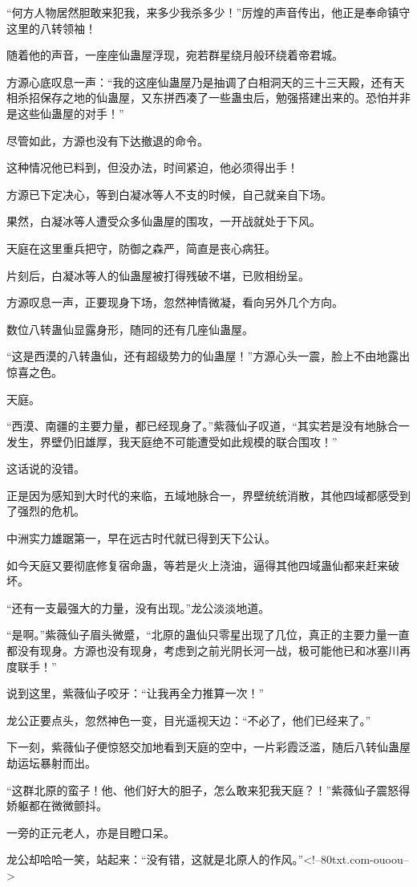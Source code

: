 \begin{this_body}
“何方人物居然胆敢来犯我，来多少我杀多少！”厉煌的声音传出，他正是奉命镇守这里的八转领袖！

随着他的声音，一座座仙蛊屋浮现，宛若群星绕月般环绕着帝君城。

方源心底叹息一声：“我的这座仙蛊屋乃是抽调了白相洞天的三十三天殿，还有天相杀招保存之地的仙蛊屋，又东拼西凑了一些蛊虫后，勉强搭建出来的。恐怕并非是这些仙蛊屋的对手！”

尽管如此，方源也没有下达撤退的命令。

这种情况他已料到，但没办法，时间紧迫，他必须得出手！

方源已下定决心，等到白凝冰等人不支的时候，自己就亲自下场。

果然，白凝冰等人遭受众多仙蛊屋的围攻，一开战就处于下风。

天庭在这里重兵把守，防御之森严，简直是丧心病狂。

片刻后，白凝冰等人的仙蛊屋被打得残破不堪，已败相纷呈。

方源叹息一声，正要现身下场，忽然神情微凝，看向另外几个方向。

数位八转蛊仙显露身形，随同的还有几座仙蛊屋。

“这是西漠的八转蛊仙，还有超级势力的仙蛊屋！”方源心头一震，脸上不由地露出惊喜之色。

天庭。

“西漠、南疆的主要力量，都已经现身了。”紫薇仙子叹道，“其实若是没有地脉合一发生，界壁仍旧雄厚，我天庭绝不可能遭受如此规模的联合围攻！”

这话说的没错。

正是因为感知到大时代的来临，五域地脉合一，界壁统统消散，其他四域都感受到了强烈的危机。

中洲实力雄踞第一，早在远古时代就已得到天下公认。

如今天庭又要彻底修复宿命蛊，等若是火上浇油，逼得其他四域蛊仙都来赶来破坏。

“还有一支最强大的力量，没有出现。”龙公淡淡地道。

“是啊。”紫薇仙子眉头微蹙，“北原的蛊仙只零星出现了几位，真正的主要力量一直都没有现身。方源也没有现身，考虑到之前光阴长河一战，极可能他已和冰塞川再度联手！”

说到这里，紫薇仙子咬牙：“让我再全力推算一次！”

龙公正要点头，忽然神色一变，目光遥视天边：“不必了，他们已经来了。”

下一刻，紫薇仙子便惊怒交加地看到天庭的空中，一片彩霞泛滥，随后八转仙蛊屋劫运坛暴射而出。

“这群北原的蛮子！他、他们好大的胆子，怎么敢来犯我天庭？！”紫薇仙子震怒得娇躯都在微微颤抖。

一旁的正元老人，亦是目瞪口呆。

龙公却哈哈一笑，站起来：“没有错，这就是北原人的作风。”<!--80txt.com-ouoou-->

\end{this_body}

